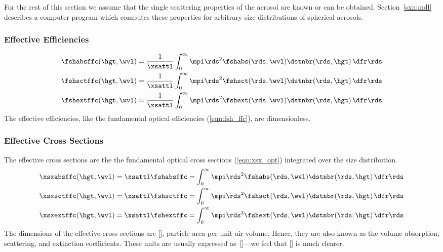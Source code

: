\documentclass[12pt]{article}
\begin{document}
For the rest of this section we assume that the single scattering
properties of the aerosol are known or can be obtained.
Section~\ref{sxn:mdl} describes a computer program which computes 
these properties for arbitrary size distributions of spherical
aerosols. 

\subsubsection[Effective Efficiencies]{Effective Efficiencies}\label{sxn:fsh_ffc}
\begin{subequations}
\label{eqn:fsh_ffc}
\begin{align}
\label{eqn:fsh_abs_ffc}
\fshabsffc(\hgt,\wvl) & = \frac{1}{\xsattl} \int_{0}^{\infty}
\mpi \rds^{2} \fshabs(\rds,\wvl) \dstnbr(\rds,\hgt) \,\dfr\rds \\
\label{eqn:fsh_sct_ffc}
\fshsctffc(\hgt,\wvl) & = \frac{1}{\xsattl} \int_{0}^{\infty}
\mpi \rds^{2} \fshsct(\rds,\wvl) \dstnbr(\rds,\hgt) \,\dfr\rds \\
\label{eqn:fsh_ext_ffc}
\fshextffc(\hgt,\wvl) & = \frac{1}{\xsattl} \int_{0}^{\infty}
\mpi \rds^{2} \fshext(\rds,\wvl) \dstnbr(\rds,\hgt) \,\dfr\rds
\end{align}
\end{subequations}
The effective efficiencies, like the fundamental optical efficiencies
(\ref{eqn:fsh_ffc}), are dimensionless.

\subsubsection[Effective Cross Sections]{Effective Cross Sections}\label{sxn:xsx_ffc}
The effective cross sections are the the fundamental optical cross 
sections (\ref{eqn:xsx_opt}) integrated over the size distribution.
\begin{subequations}
\label{eqn:xsx_ffc}
\begin{align}
\label{eqn:xsx_abs_ffc}
\xsxabsffc(\hgt,\wvl) & = \xsattl \fshabsffc =
\int_{0}^{\infty}
\mpi \rds^{2} \fshabs(\rds,\wvl) \dstnbr(\rds,\hgt) \,\dfr\rds \\
\label{eqn:xsx_sct_ffc}
\xsxsctffc(\hgt,\wvl) & = \xsattl \fshsctffc =
\int_{0}^{\infty}
\mpi \rds^{2} \fshsct(\rds,\wvl) \dstnbr(\rds,\hgt) \,\dfr\rds \\
\label{eqn:xsx_ext_ffc}
\xsxextffc(\hgt,\wvl) & = \xsattl \fshextffc =
\int_{0}^{\infty}
\mpi \rds^{2} \fshext(\rds,\wvl) \dstnbr(\rds,\hgt) \,\dfr\rds
\end{align}
\end{subequations}
The dimensions of the effective cross-sections are [\mSxmC], particle
area per unit air volume. 
Hence, they are also known as the volume absorption, scattering, and 
extinction coefficients.
These units are usually expressed as~[\xm]---we feel that [\mSxmC] is
much clearer.
\end{document}
